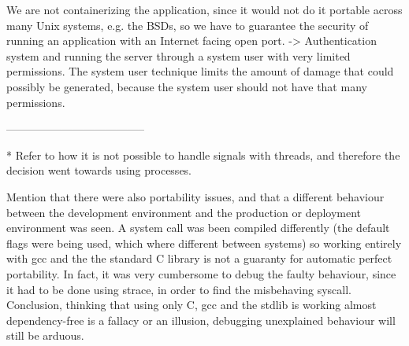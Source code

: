 We are not containerizing the application, since it would not do it portable across many Unix systems, e.g. the BSDs, so we have to guarantee the security of running an application with an Internet facing open port. -> Authentication system and running the server through a system user with very limited permissions.
The system user technique limits the amount of damage that could possibly be generated, because the system user should not  have that many permissions.

\cite{Kerrisk2021}

--------------------------------------

* Refer to how it is not possible to handle signals with threads, and therefore the decision went towards using processes.

Mention that there were also portability issues, and that a different behaviour between the development environment and the production or deployment environment was seen. A system call was been compiled differently (the default flags were being used, which where different between systems) so working entirely with gcc and the the standard C library is not a guaranty for automatic perfect portability. In fact, it was very cumbersome to debug the faulty behaviour, since it had to be done using strace, in order to find the misbehaving syscall. Conclusion, thinking that using only C, gcc and the stdlib is working almost dependency-free is a fallacy or an illusion, debugging unexplained behaviour will still be arduous.